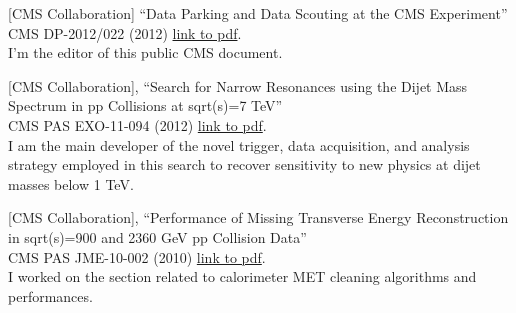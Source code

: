 \documentclass[10pt, a4paper]{article}
\begin{document}
\begin{thebibliography}{599}
[CMS Collaboration]
``Data Parking and Data Scouting at the CMS Experiment''
  CMS DP-2012/022 (2012)
  \href{http://cds.cern.ch/record/1480607/files/DP2012\_022.pdf}{link
    to pdf}.
  \\I'm the editor of this public CMS document.

[CMS Collaboration],
``Search for Narrow Resonances using the Dijet Mass Spectrum in pp Collisions at sqrt(s)=7 TeV''\\
  CMS PAS EXO-11-094 (2012)
  \href{http://cds.cern.ch/record/1461223/files/EXO-11-094-pas.pdf}{link
  to pdf}.
  \\ I am the main developer of the novel trigger, data acquisition, and analysis strategy employed in this search to recover sensitivity to new physics at dijet masses below 1 TeV.

  

[CMS Collaboration],
``Performance of Missing Transverse Energy Reconstruction in sqrt(s)=900 and 2360 GeV pp Collision Data''\\
  CMS PAS JME-10-002 (2010)
  \href{http://cdsweb.cern.ch/record/1247385/files/JME-10-002-pas.pdf}{link
  to pdf}.
  \\ I worked on the section related to calorimeter MET cleaning algorithms and performances.


\end{thebibliography}
\end{document}
